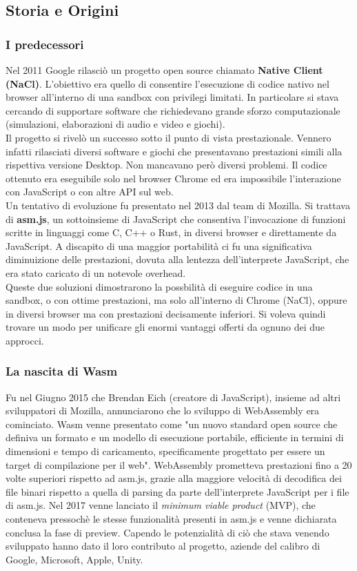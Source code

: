 \subsection{Storia e Origini}
\subsubsection{I predecessori}
Nel 2011 Google rilasciò un progetto open source chiamato \textbf{Native Client (NaCl)}.
L'obiettivo era quello di consentire l'esecuzione di codice nativo nel browser all'interno di una sandbox con privilegi limitati.
In particolare si stava cercando di supportare software che richiedevano grande sforzo computazionale (simulazioni, elaborazioni di audio e video e giochi).
\\Il progetto si rivelò un successo sotto il punto di vista prestazionale. Vennero infatti rilasciati diversi software e giochi che presentavano prestazioni simili alla rispettiva versione Desktop.
Non mancavano però diversi problemi. Il codice ottenuto era eseguibile solo nel browser Chrome ed era impossibile l'interazione con JavaScript o con altre API sul web.
\\Un tentativo di evoluzione fu presentato nel 2013 dal team di Mozilla. Si trattava di \textbf{asm.js}, un sottoinsieme di JavaScript che consentiva l'invocazione di funzioni scritte in linguaggi come C, C++ o Rust, in diversi browser e direttamente da JavaScript.
A discapito di una maggior portabilità ci fu una significativa diminuizione delle prestazioni, dovuta alla lentezza dell'interprete JavaScript, che era stato caricato di un notevole overhead.
\\Queste due soluzioni dimostrarono la possbilità di eseguire codice in una sandbox, o con ottime prestazioni, ma solo all'interno di Chrome (NaCl), oppure in diversi browser ma con prestazioni decisamente inferiori.
Si voleva quindi trovare un modo per unificare gli enormi vantaggi offerti da ognuno dei due approcci.\cite*{wasmBook}
\subsubsection{La nascita di Wasm}
Fu nel Giugno 2015 che Brendan Eich (creatore di JavaScript), insieme ad altri sviluppatori di Mozilla, annunciarono che lo sviluppo di WebAssembly era cominciato.\cite*{asmjsToWasm}
Wasm venne presentato come "un nuovo standard open source che definiva un formato e un modello di esecuzione portabile, efficiente in termini di dimensioni e tempo di caricamento, specificamente progettato per essere un target di compilazione per il web".
WebAssembly prometteva prestazioni fino a 20 volte superiori rispetto ad asm.js, grazie alla maggiore velocità di decodifica dei file binari rispetto a quella di parsing da parte dell'interprete JavaScript per i file di asm.js.
Nel 2017 venne lanciato il \emph{minimum viable product} (MVP), che conteneva pressochè le stesse funzionalità presenti in asm.js e venne dichiarata conclusa la fase di preview.
Capendo le potenzialità di ciò che stava venendo sviluppato hanno dato il loro contributo al progetto, aziende del calibro di Google, Microsoft, Apple, Unity.

